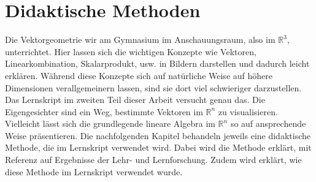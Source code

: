 \section*{Didaktische Methoden}
Die Vektorgeometrie wir am Gymnasium im Anschauungsraum, also im $\mathbb R^3$, unterrichtet.
Hier lassen sich die wichtigen Konzepte wie Vektoren, Linearkombination, Skalarprodukt, usw. in Bildern darstellen und dadurch leicht erklären.
Während diese Konzepte sich auf natürliche Weise auf höhere Dimensionen verallgemeinern lassen, sind sie dort viel schwieriger darzustellen.
Das Lernskript im zweiten Teil dieser Arbeit versucht genau das.
Die Eigengesichter sind ein Weg, bestimmte Vektoren im $\mathbb R^n$ zu visualisieren.
Vielleicht lässt sich die grundlegende lineare Algebra im $\mathbb R^n$ so auf ansprechende Weise präsentieren.
Die nachfolgenden Kapitel behandeln jeweils eine didaktische Methode, die im Lernskript verwendet wird.
Dabei wird die Methode erklärt, mit Referenz auf Ergebnisse der Lehr- und Lernforschung.
Zudem wird erklärt, wie diese Methode im Lernskript verwendet wurde.

